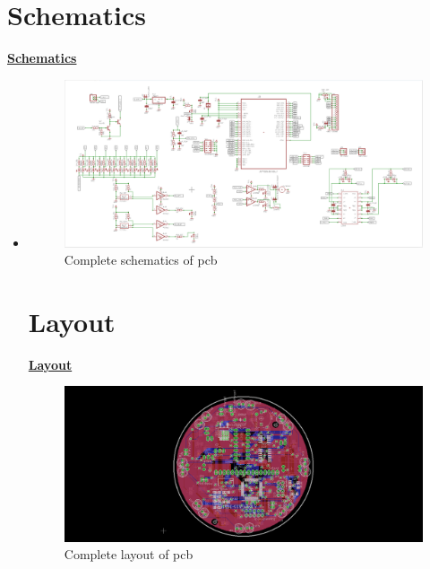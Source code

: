 \documentclass[a4paper,12pt,oneside]{book}
\begin{document}
	\chapter[Schematics]{Schematics}
	\underline{\textbf{\Large{Schematics}}}
	\begin{itemize}
		\item {}
	\begin{figure}[h!]
		\caption{Complete schematics of pcb}
		\includegraphics[width=\textwidth]{./HardwareManual/capture.png}
	\end{figure}	
	
		\chapter[Layout]{Layout}
	\underline{\textbf{\Large{Layout}}}

	\begin{figure}[h!]
		\caption{Complete layout of pcb}
		\includegraphics[width=\textwidth]{./HardwareManual/capture1.png}
	\end{figure}		



\end{itemize}
\end{document}
